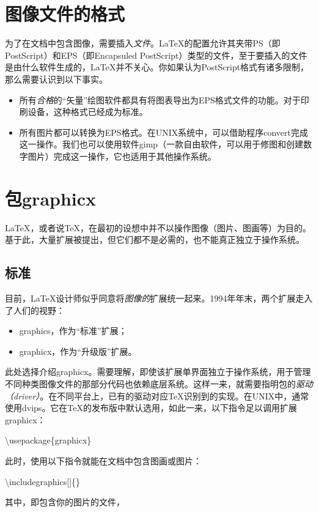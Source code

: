 \section{图像文件的格式}

为了在文档中包含图像，需要插入\emph{文件}。\LaTeX 的配置允许其夹带PS（即PostScript）和EPS（即Encapsuled PostScript）类型的文件，至于要插入的文件是由什么软件生成的，\LaTeX 并不关心。你如果认为PostScript格式有诸多限制，那么需要认识到以下事实。

\begin{itemize}
    \item 所有\emph{合格}的“矢量”绘图软件都具有将图表导出为EPS格式文件的功能。对于印刷设备，这种格式已经成为标准。
    \item 所有图片都可以转换为EPS格式。在UNIX系统中，可以借助程序\textsf{convert}完成这一操作。我们也可以使用软件\textsf{gimp}（一款自由软件，可以用于修图和创建数字图片）完成这一操作，它也适用于其他操作系统。
\end{itemize}

\section{包\textsf{graphicx}}

\LaTeX ，或者说\TeX ，在最初的设想中并不以操作图像（图片、图画等）为目的。基于此，大量扩展被提出，但它们都不是必需的，也不能真正独立于操作系统。

\subsection{标准}

目前，\LaTeX 设计师似乎同意将\emph{图像的}扩展统一起来。1994年年末，两个扩展走入了人们的视野：

\begin{itemize}
    \item \textsf{graphics}，作为“标准”扩展；
    \item \textsf{graphicx}，作为“升级版”扩展。
\end{itemize}

此处选择介绍\textsf{graphicx}。需要理解，即使该扩展单界面独立于操作系统，用于管理不同种类图像文件的那部分代码也依赖底层系统。这样一来，就需要指明包的\emph{驱动（driver）}。在不同平台上，已有的驱动对应\TeX 识别到的实现。在UNIX中，通常使用\textsf{dvips}。它在\TeX 的发布版中默认选用，如此一来，以下指令足以调用扩展\textsf{graphicx}：

\begin{dmd}
\backslash usepackage\{graphicx\}
\end{dmd}

此时，使用以下指令就能在文档中包含图画或图片：

\begin{dmd}
\backslash includegraphics[]\{\}
\end{dmd}

其中，即包含你的图片的文件，